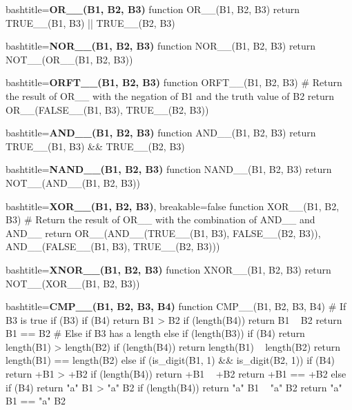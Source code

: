 \begin{NexCodeBox}{bash}{title=\textbf{OR__(B1, B2, B3)}}
function OR__(B1, B2, B3)
{
        return TRUE__(B1, B3) || TRUE__(B2, B3)
}
\end{NexCodeBox}

\begin{NexCodeBox}{bash}{title=\textbf{NOR__(B1, B2, B3)}}
function NOR__(B1, B2, B3)
{
        return NOT__(OR__(B1, B2, B3))
}
\end{NexCodeBox}

\begin{NexCodeBox}{bash}{title=\textbf{ORFT__(B1, B2, B3)}}
function ORFT__(B1, B2, B3)
{
        # Return the result of OR__ with the negation of B1 and the truth value of B2
        return OR__(FALSE__(B1, B3), TRUE__(B2, B3))
}
\end{NexCodeBox}

\begin{NexCodeBox}{bash}{title=\textbf{AND__(B1, B2, B3)}}
function AND__(B1, B2, B3)
{
        return TRUE__(B1, B3) && TRUE__(B2, B3)
}
\end{NexCodeBox}

\begin{NexCodeBox}{bash}{title=\textbf{NAND__(B1, B2, B3)}}
function NAND__(B1, B2, B3)
{
        return NOT__(AND__(B1, B2, B3))
}
\end{NexCodeBox}

\begin{NexCodeBox}{bash}{title=\textbf{XOR__(B1, B2, B3)}, breakable=false}
function XOR__(B1, B2, B3)
{
        # Return the result of OR__ with the combination of AND__ and AND__
        return OR__(AND__(TRUE__(B1, B3), FALSE__(B2, B3)), 
                    AND__(FALSE__(B1, B3), TRUE__(B2, B3)))
}
\end{NexCodeBox}

\begin{NexCodeBox}{bash}{title=\textbf{XNOR__(B1, B2, B3)}}
function XNOR__(B1, B2, B3)
{
        return NOT__(XOR__(B1, B2, B3))
}
\end{NexCodeBox}

\begin{NexCodeBox}{bash}{title=\textbf{CMP__(B1, B2, B3, B4)}}
function CMP__(B1, B2, B3, B4)
{
        # If B3 is true
        if (B3) {
                if (B4)
                        return B1 > B2
                if (length(B4))
                        return B1 ~ B2
                return B1 == B2
        # Else if B3 has a length
        } else if (length(B3)) {
                if (B4)
                        return length(B1) > length(B2)
                if (length(B4))
                        return length(B1) ~ length(B2)
                return length(B1) == length(B2)
        } else if (is_digit(B1, 1) && is_digit(B2, 1)) {
                if (B4)
                        return +B1 > +B2
                if (length(B4))
                        return +B1 ~ +B2
                return +B1 == +B2
        } else {
                if (B4)
                        return "a" B1 > "a" B2
                if (length(B4))
                        return "a" B1 ~ "a" B2
                return "a" B1 == "a" B2
        }
}
\end{NexCodeBox}

